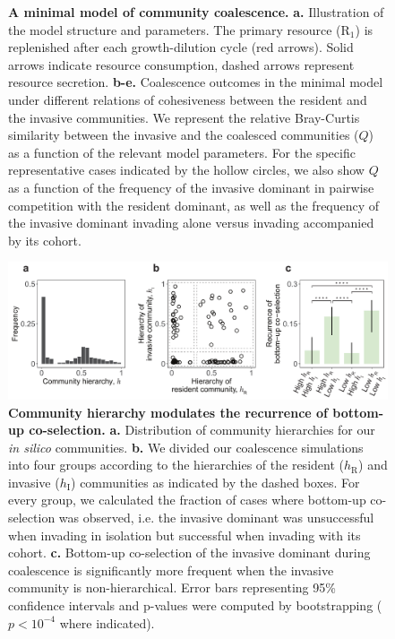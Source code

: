 \documentclass[a4paper,10pt]{article}
\begin{document}
\begin{figure}[!h]
\caption{\textbf{A minimal model of community coalescence.}
\textbf{a.} Illustration of the model structure and parameters.
The primary resource ($\mathrm{R}_1$) is replenished after
each growth-dilution cycle (red arrows).
Solid arrows indicate resource consumption, dashed arrows represent
resource secretion.
\textbf{b-e.} Coalescence outcomes in the minimal model
under different relations of cohesiveness between the
resident and the invasive communities.
We represent the relative Bray-Curtis similarity
between the invasive and the coalesced communities ($Q$) as a function of
the relevant model parameters.
For the specific representative cases indicated by the hollow circles,
we also show $Q$ as a function of the frequency of the invasive dominant
in pairwise competition with the resident dominant,
as well as the frequency of the invasive dominant invading alone versus invading
accompanied by its cohort.}
\label{fig4}
\end{figure}

\clearpage

\begin{figure}[!h]
\centering
\internallinenumbers
\includegraphics[scale=0.7,keepaspectratio]{figs/fig5_v2.pdf}
\caption{\textbf{Community hierarchy modulates the recurrence of bottom-up co-selection.}
\textbf{a.} Distribution of community hierarchies for our \textit{in silico} communities.
\textbf{b.} We divided our coalescence simulations into four groups according to the
hierarchies of the resident ($h_\mathrm{R}$) and invasive ($h_\mathrm{I}$) communities
as indicated by the dashed boxes.
For every group, we calculated the fraction of cases where bottom-up co-selection was observed,
i.e. the invasive dominant was unsuccessful when invading in isolation
but successful when invading with its cohort.
\textbf{c.} Bottom-up co-selection of the invasive dominant during coalescence
is significantly more frequent when the invasive community is non-hierarchical.
Error bars representing 95\% confidence intervals
and p-values were computed by bootstrapping
($p<10^{-4}$ where indicated).}
\label{fig5}
\end{figure}
\end{document}
